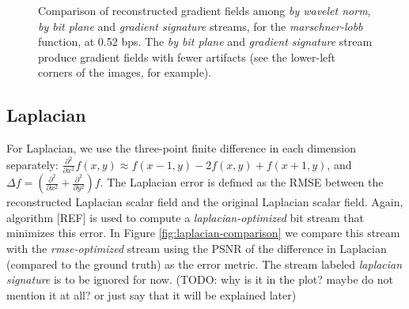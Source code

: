 \begin{figure}
	\caption{Comparison of reconstructed gradient fields among \emph{by wavelet norm}, \emph{by bit
	plane} and \emph{gradient signature} streams, for the \emph{marschner-lobb} function, at 0.52 bps.
	The \emph{by bit plane} and \emph{gradient signature} stream produce gradient fields with fewer
	artifacts (see the lower-left corners of the images, for example). }
  \label{fig:gradient-rendering}
\end{figure}

\subsection{Laplacian}

For Laplacian, we use the three-point finite difference in each dimension separately:
$\frac{{\partial}^2}{\partial{x^2}}f(x,y) \approx f(x-1,y)-2f(x,y)+f(x+1,y)$, and $\Delta
f=(\frac{{\partial}^2}{\partial{x^2}}+\frac{{\partial}^2}{\partial{y^2}})f$. The Laplacian error is
defined as the RMSE between the reconstructed Laplacian scalar field and the original Laplacian
scalar field. Again, algorithm [REF] is used to compute a \emph{laplacian-optimized} bit stream that
minimizes this error. In Figure \ref{fig:laplacian-comparison} we compare this stream with the
\emph{rmse-optimized} stream using the PSNR of the difference in Laplacian (compared to the
ground truth) as the error metric. The stream labeled \emph{laplacian signature} is to be ignored for
now. (TODO: why is it in the plot? maybe do not mention it at all? or just say that it will be explained later)


